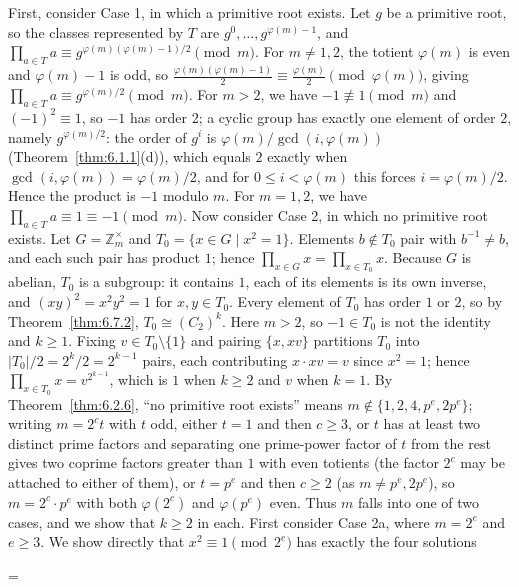 \documentclass[11pt]{article}
\makeatletter
\let\nt@closedisplay\]
\def\nt@guardedclose{\@ifnextchar\par{\nt@closeafterpar}{\@ifnextchar\end{\postdisplaypenalty\@M\nt@closedisplay}{\nt@closedisplay}}}
\def\nt@closeafterpar\par{\@ifnextchar\par{\nt@closeafterpar}{\@ifnextchar\end{\postdisplaypenalty\@M\nt@closedisplay\par}{\nt@closedisplay\par}}}
\renewenvironment{proof}[1][\proofname]{\par
  \pushQED{\qed}\normalfont\topsep\medskipamount\edef\nt@afterproof{\@endparpenalty=\the\@endparpenalty\relax}\@beginparpenalty\@M\@endparpenalty\@M\let\]\nt@guardedclose\trivlist\item[]\textit{#1\@addpunct{.}} \ignorespaces}{\ifvmode\addpenalty\@M\fi\popQED\nt@afterproof\endtrivlist\@endpefalse}
\theoremstyle{ntstyle}
\newcommand{\ZmodUnits}[1]{\mathbb{Z}_{#1}^{\times}}
\makeatother
\begin{document}
\begin{proof} First, consider Case 1, in which a primitive root exists.
  Let $g$ be a primitive root, so the classes represented by $T$ are $g^{0}, \ldots, g^{\varphi(m)-1}$, and
  $\prod_{a \in T} a \equiv g^{\varphi(m)(\varphi(m)-1)/2} \pmod{m}$. For $m \neq 1, 2$,
  the totient $\varphi(m)$ is even and $\varphi(m)-1$ is odd, so
  $\tfrac{\varphi(m)(\varphi(m)-1)}{2} \equiv \tfrac{\varphi(m)}{2} \pmod{\varphi(m)}$, giving
  $\prod_{a \in T}a\equiv g^{\varphi(m)/2}\pmod{m}$. For $m>2$, we have $-1\not\equiv1\pmod{m}$ and
  $(-1)^2\equiv1$, so $-1$ has order $2$; a cyclic group has exactly one element of order $2$, namely
  $g^{\varphi(m)/2}$: the order of $g^{i}$ is $\varphi(m)/\gcd(i,\varphi(m))$ (Theorem~\ref{thm:6.1.1}(d)), which
  equals $2$ exactly when $\gcd(i,\varphi(m))=\varphi(m)/2$, and for $0\le i<\varphi(m)$ this forces
  $i=\varphi(m)/2$. Hence the product is $-1$ modulo $m$. For $m = 1, 2$,
  we have $\prod_{a \in T} a \equiv 1 \equiv -1 \pmod{m}$. Now consider Case 2, in which no
  primitive root exists. Let $G = \ZmodUnits{m}$ and $T_0 = \{x \in G \mid x^{2} = 1\}$. Elements $b \notin T_0$
  pair with $b^{-1} \neq b$, and each such pair has product $1$; hence $\prod_{x \in G} x = \prod_{x \in T_0} x$.
  Because $G$
  is abelian, $T_0$ is a subgroup: it contains $1$, each of its elements is
  its own inverse, and $(xy)^2=x^2y^2=1$ for $x,y\in T_0$. Every element
  of $T_0$ has order $1$ or $2$, so by
  Theorem~\ref{thm:6.7.2}, $T_0 \cong (C_2)^{k}$. Here $m>2$, so $-1\in T_0$ is not the identity and $k\ge1$.
  Fixing $v \in T_0 \setminus \{1\}$ and pairing $\{x, xv\}$ partitions $T_0$ into
    $|T_0|/2 = 2^{k}/2 = 2^{k-1}$ pairs, each contributing
  $x\cdot xv = v$ since $x^{2} = 1$; hence $\prod_{x \in T_0} x = v^{2^{k-1}}$, which is $1$ when $k \ge 2$ and $v$
  when $k = 1$. By
  Theorem~\ref{thm:6.2.6}, ``no primitive root exists'' means $m \notin \{1, 2, 4, p^{e}, 2p^{e}\}$; writing
  $m = 2^{c} t$ with $t$ odd, either $t = 1$
  and then $c \ge 3$, or $t$ has at least two distinct prime factors and
  separating one prime-power factor of $t$ from the rest gives two coprime factors greater than $1$ with even totients
  (the factor $2^{c}$ may be attached to either of them), or $t = p^{e}$ and then $c \ge 2$
  (as $m \neq p^{e}, 2p^{e}$), so $m = 2^{c} \cdot p^{e}$ with both
  $\varphi(2^{c})$ and $\varphi(p^{e})$ even. Thus $m$ falls into one of
  two cases, and we show that $k \ge 2$ in each. First consider Case 2a, where $m = 2^{e}$ and $e \ge 3$. We show
  directly that $x^{2} \equiv 1 \pmod{2^{e}}$ has exactly the four solutions

\end{proof}
\end{document}
